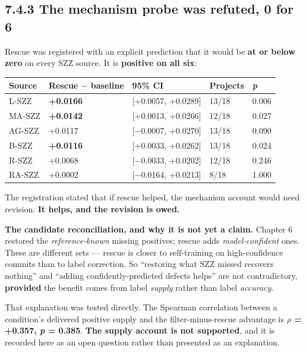 \subsection{7.4.3 The mechanism probe was refuted, 0 for
6}\label{the-mechanism-probe-was-refuted-0-for-6}

Rescue was registered with an explicit prediction that it would be
\textbf{at or below zero} on every SZZ source. It is \textbf{positive on
all six}:

\begin{longtable}[]{@{}lllll@{}}
\toprule\noalign{}
Source & Rescue \ensuremath{-} baseline & 95\% CI & Projects & \emph{p} \\
\midrule\noalign{}
\endhead
\bottomrule\noalign{}
\endlastfoot
L-SZZ & \textbf{+0.0166} & {[}+0.0057, +0.0289{]} & 13/18 & 0.006 \\
MA-SZZ & \textbf{+0.0142} & {[}+0.0013, +0.0266{]} & 12/18 & 0.027 \\
AG-SZZ & +0.0117 & {[}\ensuremath{-}0.0007, +0.0270{]} & 13/18 & 0.090 \\
B-SZZ & \textbf{+0.0116} & {[}+0.0033, +0.0262{]} & 13/18 & 0.024 \\
R-SZZ & +0.0068 & {[}\ensuremath{-}0.0033, +0.0202{]} & 12/18 & 0.246 \\
RA-SZZ & +0.0002 & {[}\ensuremath{-}0.0164, +0.0213{]} & 8/18 & 1.000 \\
\end{longtable}

The registration stated that if rescue helped, the mechanism account
would need revision. \textbf{It helps, and the revision is owed.}

\textbf{The candidate reconciliation, and why it is not yet a claim.}
Chapter 6 restored the \emph{reference-known} missing positives; rescue
adds \emph{model-confident} ones. These are different sets --- rescue is
closer to self-training on high-confidence commits than to label
correction. So ``restoring what SZZ missed recovers nothing'' and
``adding confidently-predicted defects helps'' are not contradictory,
\textbf{provided} the benefit comes from label \emph{supply} rather than
label \emph{accuracy}.

That explanation was tested directly. The Spearman correlation between a
condition's delivered positive supply and the filter-minus-rescue
advantage is \textbf{\ensuremath{\rho} = +0.357, \emph{p} = 0.385}. \textbf{The supply
account is not supported}, and it is recorded here as an open question
rather than presented as an explanation.

